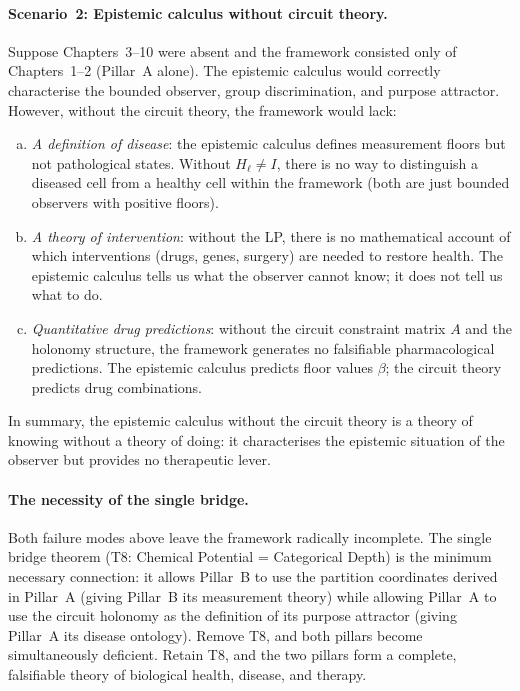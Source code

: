 \paragraph{Scenario~2: Epistemic calculus without circuit theory.}
Suppose Chapters~3--10 were absent and the framework consisted only of
Chapters~1--2 (Pillar~A alone).  The epistemic calculus would correctly
characterise the bounded observer, group discrimination, and purpose attractor.
However, without the circuit theory, the framework would lack:
\begin{enumerate}[(a)]
  \item \emph{A definition of disease}: the epistemic calculus defines
    measurement floors but not pathological states.  Without $H_\ell \neq I$,
    there is no way to distinguish a diseased cell from a healthy cell within
    the framework (both are just bounded observers with positive floors).
  \item \emph{A theory of intervention}: without the LP, there is no
    mathematical account of which interventions (drugs, genes, surgery) are
    needed to restore health.  The epistemic calculus tells us what the
    observer cannot know; it does not tell us what to do.
  \item \emph{Quantitative drug predictions}: without the circuit constraint
    matrix $A$ and the holonomy structure, the framework generates no
    falsifiable pharmacological predictions.  The epistemic calculus predicts
    floor values $\beta$; the circuit theory predicts drug combinations.
\end{enumerate}
In summary, the epistemic calculus without the circuit theory is a theory of
knowing without a theory of doing: it characterises the epistemic situation
of the observer but provides no therapeutic lever.

\paragraph{The necessity of the single bridge.}
Both failure modes above leave the framework radically incomplete.  The single
bridge theorem (T8: Chemical Potential = Categorical Depth) is the minimum
necessary connection: it allows Pillar~B to use the partition coordinates
derived in Pillar~A (giving Pillar~B its measurement theory) while allowing
Pillar~A to use the circuit holonomy as the definition of its purpose attractor
(giving Pillar~A its disease ontology).  Remove T8, and both pillars become
simultaneously deficient.  Retain T8, and the two pillars form a complete,
falsifiable theory of biological health, disease, and therapy.

